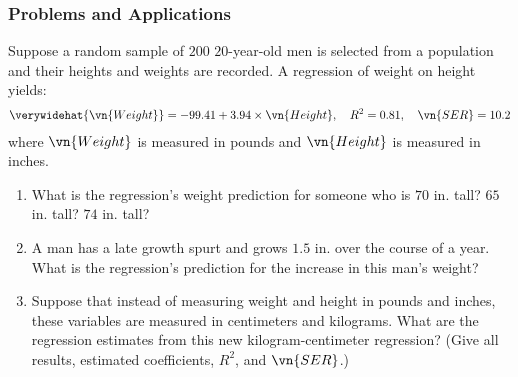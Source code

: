 

\begin{frame}
\frametitle{Problems and Applications}
Suppose a random sample of $200$ $20$-year-old men is selected from a population and their heights and weights are recorded. A regression of weight on height yields:
\begin{align*}
\verywidehat{\vn{Weight}} 
  = -99.41 + 3.94 \times \vn{Height},
  \quad R^2 = 0.81,
  \quad \vn{SER} = 10.2
\end{align*}
where $\vn{Weight}$ is measured in pounds and $\vn{Height}$ is measured in inches. 
\begin{enumerate}
\item What is the regression's weight prediction for someone who is $70$ in. tall? $65$ in. tall? $74$ in. tall?
\item A man has a late growth spurt and grows $1.5$ in. over the course of a year. What is the regression's prediction for the increase in this man's weight?
\item Suppose that instead of measuring weight and height in pounds and inches, these variables are measured in centimeters and kilograms. What are the regression estimates from this new kilogram-centimeter regression? (Give all results, estimated coefficients, $R^{2}$, and $\vn{SER}$.)
\end{enumerate}
\end{frame}

